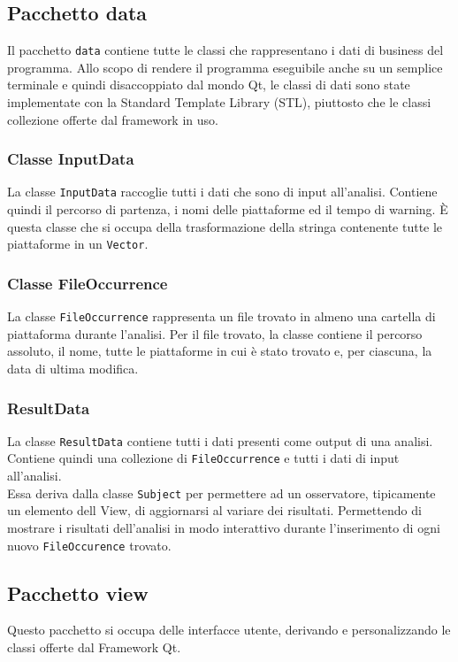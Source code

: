 \subsection{Pacchetto data}
Il pacchetto \texttt{data} contiene tutte le classi che rappresentano i dati di business del programma. Allo scopo di rendere il programma eseguibile anche su un semplice terminale e quindi disaccoppiato dal mondo Qt, le classi di dati sono state implementate con la Standard Template Library (STL), piuttosto che le classi collezione offerte dal framework in uso.

\subsubsection{Classe InputData}
La classe \texttt{InputData} raccoglie tutti i dati che sono di input all'analisi. Contiene quindi il percorso di partenza, i nomi delle piattaforme ed il tempo di warning. È questa classe che si occupa della trasformazione della stringa contenente tutte le piattaforme in un \texttt{Vector}.

\subsubsection{Classe FileOccurrence}
La classe \texttt{FileOccurrence} rappresenta un file trovato in almeno una cartella di piattaforma durante l'analisi. Per il file trovato, la classe contiene il percorso assoluto, il nome, tutte le piattaforme in cui è stato trovato e, per ciascuna, la data di ultima modifica. 

\subsubsection{ResultData}
La classe \texttt{ResultData} contiene tutti i dati presenti come output di una analisi. Contiene quindi una collezione di \texttt{FileOccurrence} e tutti i dati di input all'analisi.\\
Essa deriva dalla classe \texttt{Subject} per permettere ad un osservatore, tipicamente un elemento dell View, di aggiornarsi al variare dei risultati. Permettendo di mostrare i risultati dell'analisi in modo interattivo durante l'inserimento di ogni nuovo \texttt{FileOccurence} trovato.

\subsection{Pacchetto view}
Questo pacchetto si occupa delle interfacce utente, derivando e personalizzando le classi offerte dal Framework Qt.

